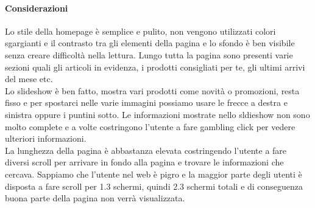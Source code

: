 \documentclass[12pt]{article}
\begin{document}
	\paragraph{Considerazioni}
	Lo stile della homepage è semplice e pulito, non vengono utilizzati colori sgargianti e il contrasto tra gli elementi della pagina e lo sfondo è ben visibile senza creare difficoltà nella lettura.
	Lungo tutta la pagina sono presenti varie sezioni quali gli articoli in evidenza, i prodotti consigliati per te, gli ultimi arrivi del mese etc. 
	\\
	Lo slideshow è ben fatto, mostra vari prodotti come novità o promozioni, resta fisso e per spostarci nelle varie immagini possiamo usare le frecce a destra e sinistra oppure i puntini sotto. Le informazioni mostrate nello sldieshow non sono molto complete e a volte costringono l'utente a fare gambling click per vedere ulteriori informazioni.\\
	La lunghezza della pagina è abbastanza elevata costringendo l'utente a fare diversi scroll per arrivare in fondo alla pagina e trovare le informazioni che cercava. Sappiamo che l'utente nel web è pigro e la maggior parte degli utenti è disposta a fare scroll per 1.3 schermi, quindi 2.3 schermi totali e di conseguenza buona parte della pagina non verrà visualizzata. 
\end{document}
